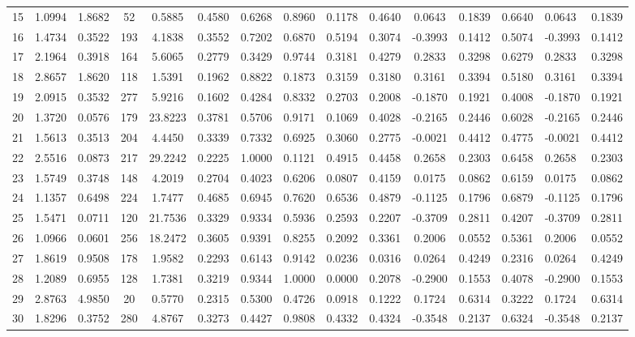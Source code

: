 \begin{tabular}{|c|c|c|c|c|c|c|c|c|c|c|c|c|}
15 & 1.0994 & 1.8682 & 52 & 0.5885 & 0.4580 & 0.6268 & 0.8960 & 0.1178 & 0.4640 & 0.0643 & 0.1839 & 0.6640 & 0.0643 & 0.1839 \\
16 & 1.4734 & 0.3522 & 193 & 4.1838 & 0.3552 & 0.7202 & 0.6870 & 0.5194 & 0.3074 & -0.3993 & 0.1412 & 0.5074 & -0.3993 & 0.1412 \\
17 & 2.1964 & 0.3918 & 164 & 5.6065 & 0.2779 & 0.3429 & 0.9744 & 0.3181 & 0.4279 & 0.2833 & 0.3298 & 0.6279 & 0.2833 & 0.3298 \\
18 & 2.8657 & 1.8620 & 118 & 1.5391 & 0.1962 & 0.8822 & 0.1873 & 0.3159 & 0.3180 & 0.3161 & 0.3394 & 0.5180 & 0.3161 & 0.3394 \\
19 & 2.0915 & 0.3532 & 277 & 5.9216 & 0.1602 & 0.4284 & 0.8332 & 0.2703 & 0.2008 & -0.1870 & 0.1921 & 0.4008 & -0.1870 & 0.1921 \\
20 & 1.3720 & 0.0576 & 179 & 23.8223 & 0.3781 & 0.5706 & 0.9171 & 0.1069 & 0.4028 & -0.2165 & 0.2446 & 0.6028 & -0.2165 & 0.2446 \\
21 & 1.5613 & 0.3513 & 204 & 4.4450 & 0.3339 & 0.7332 & 0.6925 & 0.3060 & 0.2775 & -0.0021 & 0.4412 & 0.4775 & -0.0021 & 0.4412 \\
22 & 2.5516 & 0.0873 & 217 & 29.2242 & 0.2225 & 1.0000 & 0.1121 & 0.4915 & 0.4458 & 0.2658 & 0.2303 & 0.6458 & 0.2658 & 0.2303 \\
23 & 1.5749 & 0.3748 & 148 & 4.2019 & 0.2704 & 0.4023 & 0.6206 & 0.0807 & 0.4159 & 0.0175 & 0.0862 & 0.6159 & 0.0175 & 0.0862 \\
24 & 1.1357 & 0.6498 & 224 & 1.7477 & 0.4685 & 0.6945 & 0.7620 & 0.6536 & 0.4879 & -0.1125 & 0.1796 & 0.6879 & -0.1125 & 0.1796 \\
25 & 1.5471 & 0.0711 & 120 & 21.7536 & 0.3329 & 0.9334 & 0.5936 & 0.2593 & 0.2207 & -0.3709 & 0.2811 & 0.4207 & -0.3709 & 0.2811 \\
26 & 1.0966 & 0.0601 & 256 & 18.2472 & 0.3605 & 0.9391 & 0.8255 & 0.2092 & 0.3361 & 0.2006 & 0.0552 & 0.5361 & 0.2006 & 0.0552 \\
27 & 1.8619 & 0.9508 & 178 & 1.9582 & 0.2293 & 0.6143 & 0.9142 & 0.0236 & 0.0316 & 0.0264 & 0.4249 & 0.2316 & 0.0264 & 0.4249 \\
28 & 1.2089 & 0.6955 & 128 & 1.7381 & 0.3219 & 0.9344 & 1.0000 & 0.0000 & 0.2078 & -0.2900 & 0.1553 & 0.4078 & -0.2900 & 0.1553 \\
29 & 2.8763 & 4.9850 & 20 & 0.5770 & 0.2315 & 0.5300 & 0.4726 & 0.0918 & 0.1222 & 0.1724 & 0.6314 & 0.3222 & 0.1724 & 0.6314 \\
30 & 1.8296 & 0.3752 & 280 & 4.8767 & 0.3273 & 0.4427 & 0.9808 & 0.4332 & 0.4324 & -0.3548 & 0.2137 & 0.6324 & -0.3548 & 0.2137 \\
\bottomrule
\end{tabular}
